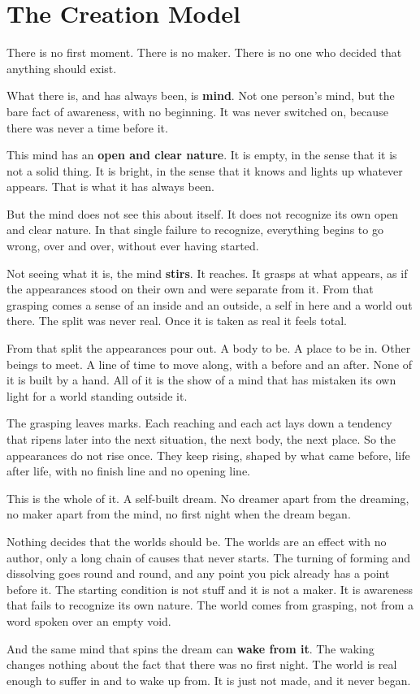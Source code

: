 \section{The Creation Model}

There is no first moment. There is no maker. There is no one who decided that
anything should exist.

What there is, and has always been, is \textbf{mind}. Not one person's mind, but the
bare fact of awareness, with no beginning. It was never switched on, because there
was never a time before it.

This mind has an \textbf{open and clear nature}. It is empty, in the sense that it is
not a solid thing. It is bright, in the sense that it knows and lights up whatever
appears. That is what it has always been.

But the mind does not see this about itself. It does not recognize its own open and
clear nature. In that single failure to recognize, everything begins to go wrong,
over and over, without ever having started.

Not seeing what it is, the mind \textbf{stirs}. It reaches. It grasps at what
appears, as if the appearances stood on their own and were separate from it. From
that grasping comes a sense of an inside and an outside, a self in here and a world
out there. The split was never real. Once it is taken as real it feels total.

From that split the appearances pour out. A body to be. A place to be in. Other
beings to meet. A line of time to move along, with a before and an after. None of it
is built by a hand. All of it is the show of a mind that has mistaken its own light
for a world standing outside it.

The grasping leaves marks. Each reaching and each act lays down a tendency that
ripens later into the next situation, the next body, the next place. So the
appearances do not rise once. They keep rising, shaped by what came before, life
after life, with no finish line and no opening line.

This is the whole of it. A self-built dream. No dreamer apart from the dreaming, no
maker apart from the mind, no first night when the dream began.

Nothing decides that the worlds should be. The worlds are an effect with no author,
only a long chain of causes that never starts. The turning of forming and
dissolving goes round and round, and any point you pick already has a point before
it. The starting condition is not stuff and it is not a maker. It is awareness that
fails to recognize its own nature. The world comes from grasping, not from a word
spoken over an empty void.

And the same mind that spins the dream can \textbf{wake from it}. The waking changes
nothing about the fact that there was no first night. The world is real enough to
suffer in and to wake up from. It is just not made, and it never began.
